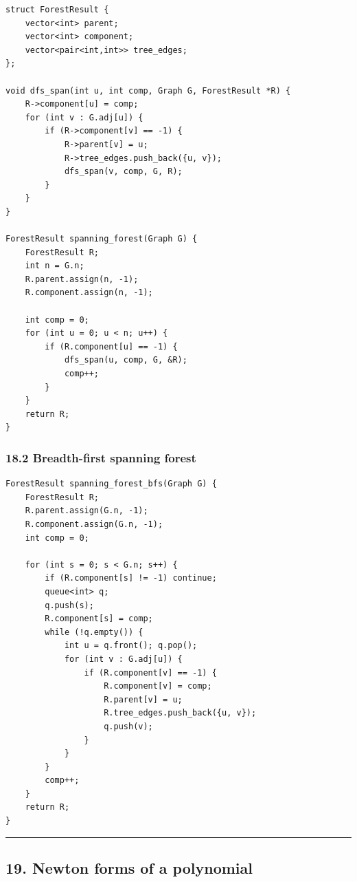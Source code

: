 \documentclass[11pt]{article}
\begin{document}
\begin{verbatim}
struct ForestResult {
    vector<int> parent;
    vector<int> component;
    vector<pair<int,int>> tree_edges;
};

void dfs_span(int u, int comp, Graph G, ForestResult *R) {
    R->component[u] = comp;
    for (int v : G.adj[u]) {
        if (R->component[v] == -1) {
            R->parent[v] = u;
            R->tree_edges.push_back({u, v});
            dfs_span(v, comp, G, R);
        }
    }
}

ForestResult spanning_forest(Graph G) {
    ForestResult R;
    int n = G.n;
    R.parent.assign(n, -1);
    R.component.assign(n, -1);

    int comp = 0;
    for (int u = 0; u < n; u++) {
        if (R.component[u] == -1) {
            dfs_span(u, comp, G, &R);
            comp++;
        }
    }
    return R;
}
\end{verbatim}

\subsubsection{18.2 Breadth-first spanning forest}\label{breadth-first-spanning-forest}

\begin{verbatim}
ForestResult spanning_forest_bfs(Graph G) {
    ForestResult R;
    R.parent.assign(G.n, -1);
    R.component.assign(G.n, -1);
    int comp = 0;

    for (int s = 0; s < G.n; s++) {
        if (R.component[s] != -1) continue;
        queue<int> q;
        q.push(s);
        R.component[s] = comp;
        while (!q.empty()) {
            int u = q.front(); q.pop();
            for (int v : G.adj[u]) {
                if (R.component[v] == -1) {
                    R.component[v] = comp;
                    R.parent[v] = u;
                    R.tree_edges.push_back({u, v});
                    q.push(v);
                }
            }
        }
        comp++;
    }
    return R;
}
\end{verbatim}

\begin{center}\rule{0.5\linewidth}{0.5pt}\end{center}

\subsection{19. Newton forms of a polynomial}\label{newton-forms-of-a-polynomial}
\end{document}
